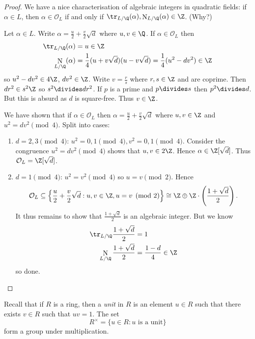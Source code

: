 \documentclass[a4paper]{article}
\renewcommand*{\O}{\mathcal{O}}
\DeclareMathOperator{\n}{N}
\begin{document}
\begin{proof}
  We have a nice characterisation of algebraic integers in quadratic fields: if \(\alpha \in L\), then \(\alpha \in \O_L\) if and only if \(\tr_{L/\Q}(\alpha), \n_{L/\Q}(\alpha) \in \Z\). (Why?)

  Let \(\alpha \in L\). Write \(\alpha = \frac{u}{2} + \frac{v}{2}\sqrt d\) where \(u, v \in \Q\). If \(\alpha \in \O_L\) then
  \begin{align*}
    \tr_{L/\Q}(\alpha) &= u \in \Z \\
    \n_{L/\Q}(\alpha) &= \frac{1}{4}(u + v\sqrt d)(u - v\sqrt d) = \frac{1}{4}(u^2 - dv^2) \in \Z
  \end{align*}
  so \(u^2 - dv^2 \in 4\Z\), \(dv^2 \in \Z\). Write \(v = \frac{r}{s}\) where \(r, s \in \Z\) and are coprime. Then \(dr^2 \in s^2\Z\) so \(s^2 \divides dr^2\). If \(p\) is a prime and \(p \divides s\) then \(p^2 \divides d\). But this is absurd as \(d\) is square-free. Thus \(v \in \Z\).

  We have shown that if \(\alpha \in \O_L\) then \(\alpha = \frac{u}{2} + \frac{v}{2}\sqrt d\) where \(u, v \in \Z\) and \(u^2 = dv^2 \pmod 4\). Split into cases:
  \begin{enumerate}
  \item \(d = 2, 3 \pmod 4\): \(u^2 = 0, 1 \pmod 4, v^2 = 0, 1 \pmod 4\). Consider the congruence \(u^2 =dv^2 \pmod 4\) shows that \(u, v \in 2\Z\). Hence \(\alpha \in \Z[\sqrt d]\). Thus \(\O_L = \Z[\sqrt d]\).
  \item \(d = 1 \pmod 4\): \(u^2 = v^2 \pmod 4\) so \(u = v \pmod 2\). Hence
    \[
      \O_L \subseteq \left\{ \frac{u}{2} + \frac{v}{2}\sqrt d: u, v \in \Z, u = v \pmod 2 \right\} \cong \Z\oplus\Z\cdot \left(\frac{1 + \sqrt d}{2} \right).
    \]
    It thus remains to show that \(\frac{1 + \sqrt d}{2}\) is an algebraic integer. But we know
    \begin{align*}
      \tr_{L/\Q} \frac{1 + \sqrt d}{2} &= 1 \\
      \n_{L/\Q} \frac{1 + \sqrt d}{2} &= \frac{1 - d}{4} \in \Z
    \end{align*}
    so done.
  \end{enumerate}
\end{proof}

Recall that if \(R\) is a ring, then a \emph{unit} in \(R\) is an element \(u \in R\) such that there exists \(v \in R\) such that \(uv = 1\). The set
\[
  R^\times = \{u \in R: u \text{ is a unit}\}
\]
form a group under multiplication.
\end{document}
